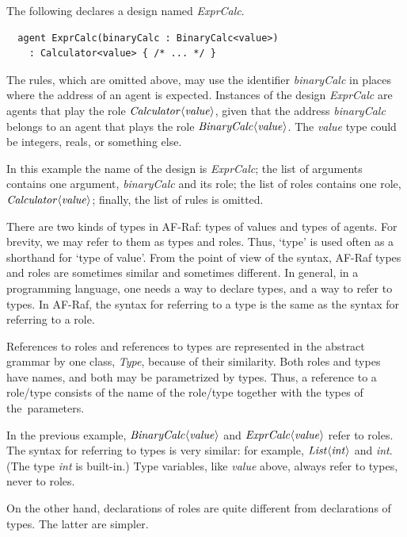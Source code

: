 \documentclass[a4paper,12pt,oneside,fleqn]{book} %
\begin{document}
{\begin{example}
The following declares a design named {\it ExprCalc}.
\begin{verbatim}
  agent ExprCalc(binaryCalc : BinaryCalc<value>)
    : Calculator<value> { /* ... */ }
\end{verbatim}
The rules, which are omitted above, may use the identifier {\it
binaryCalc\/} in places where the address of an agent is expected.
Instances of the design {\it ExprCalc\/} are agents that play the role $\it
Calculator\langle value\rangle$, given that the address {\it binaryCalc\/}
belongs to an agent that plays the role $\it BinaryCalc\langle
value\rangle$. The {\it value\/} type could be integers, reals, or
something else.

In this example the name of the design is {\it ExprCalc\/}; the list of
arguments contains one argument, {\it binaryCalc\/} and its role; the list
of roles contains one role, $\it Calculator\langle value\rangle$; finally,
the list of rules is omitted.
\end{example}

There are two kinds of types in AF-Raf: types of values and types of
agents.  For brevity, we may refer to them as types and roles. Thus, `type'
is used often as a shorthand for `type of value'. From the point of view of
the syntax, AF-Raf types and roles are sometimes similar and sometimes
different. In general, in a programming language, one needs a way to
declare types, and a way to refer to types. In AF-Raf, the syntax for
referring to a type is the same as the syntax for referring to a role.

References to roles and references to types are represented in the abstract
grammar by one class, {\it Type}, because of their similarity. Both roles
and types have names, and both may be parametrized by types. Thus, a
reference to a role/type consists of the name of the role/type together
with the types of the~parameters.

\begin{example}
In the previous example, $\it BinaryCalc\langle value\rangle$ and $\it
ExprCalc\langle value\rangle$ refer to roles.  The syntax for referring to
types is very similar: for example, $\it List\langle int\rangle$ and {\it
int}. (The type {\it int\/} is built-in.) Type variables, like {\it value}
above, always refer to types, never to roles.
\end{example}

On the other hand, declarations of roles are quite different from
declarations of types. The latter are simpler.

}
\end{document}
